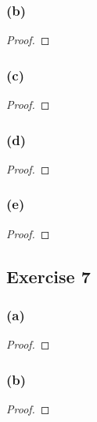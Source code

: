 \documentclass[14pt]{extarticle}
\begin{document}
\subsubsection{(b)}

\begin{proof}

\end{proof}

\subsubsection{(c)}

\begin{proof}

\end{proof}

\subsubsection{(d)}

\begin{proof}

\end{proof}

\subsubsection{(e)}

\begin{proof}

\end{proof}

\subsection{Exercise 7}

\subsubsection{(a)}

\begin{proof}

\end{proof}

\subsubsection{(b)}

\begin{proof}

\end{proof}
\end{document}
